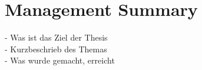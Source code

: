 \chapter{Management Summary}
\label{chap:managementSummary}

\color{black}

- Was ist das Ziel der Thesis \\
- Kurzbeschrieb des Themas \\
- Was wurde gemacht, erreicht \\